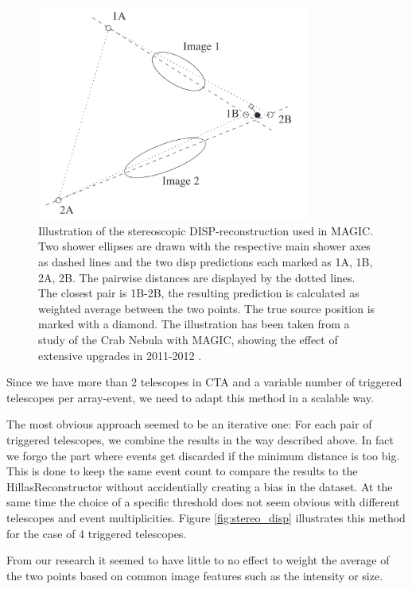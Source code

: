 \begin{figure}
    \centering
    \includegraphics[width=0.8\textwidth]{images/magic_stereo_disp.png}
    \caption{Illustration of the stereoscopic DISP-reconstruction used in MAGIC.
        Two shower ellipses are drawn with the respective main shower axes as dashed lines
        and the two disp predictions each marked as 1A, 1B, 2A, 2B.
        The pairwise distances are displayed by the dotted lines.
        The closest pair is 1B-2B, the resulting prediction is calculated as 
        weighted average between the two points. The true source position is marked with a diamond.
        The illustration has been taken from a study of the Crab Nebula with MAGIC,
        showing the effect of extensive upgrades in 2011-2012 \cite{ALEKSIC201676}.}
    \label{fig:disp_magic}
\end{figure}

Since we have more than 2 telescopes in CTA and 
a variable number of triggered telescopes per array-event,
we need to adapt this method in a scalable way.

The most obvious approach seemed to be an iterative one:
For each pair of triggered telescopes, we combine the results 
in the way described above. In fact we forgo the part where events get discarded 
if the minimum distance is too big. This is done to keep the same event count to
compare the results to the HillasReconstructor without accidentially creating a bias in the dataset.
At the same time the choice of a specific threshold does not seem obvious
with different telescopes and event multiplicities.
Figure \ref{fig:stereo_disp} illustrates this method for the case of 4 triggered telescopes.

From our research it seemed to have little to no effect to weight
the average of the two points based on common image features such as 
the intensity or size.

